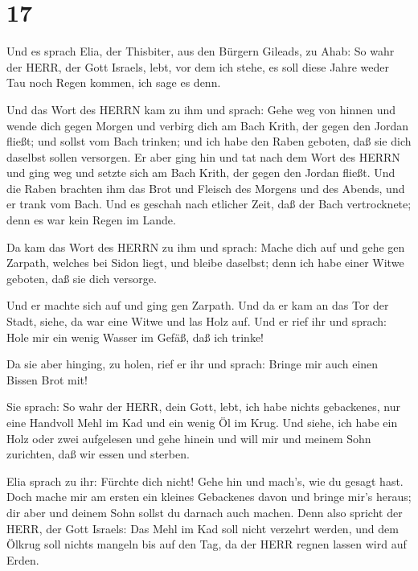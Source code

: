 \hypertarget{section-16}{%
\section{17}\label{section-16}}

 Und es sprach Elia, der Thisbiter, aus den Bürgern Gileads,
zu Ahab: So wahr der HERR, der Gott Israels, lebt, vor dem ich stehe, es
soll diese Jahre weder Tau noch Regen kommen, ich sage es denn.

 Und das Wort des HERRN kam zu ihm und sprach: 
Gehe weg von hinnen und wende dich gegen Morgen und verbirg dich am Bach
Krith, der gegen den Jordan fließt;  und sollst vom Bach
trinken; und ich habe den Raben geboten, daß sie dich daselbst sollen
versorgen.  Er aber ging hin und tat nach dem Wort des HERRN
und ging weg und setzte sich am Bach Krith, der gegen den Jordan fließt.
 Und die Raben brachten ihm das Brot und Fleisch des Morgens
und des Abends, und er trank vom Bach.  Und es geschah nach
etlicher Zeit, daß der Bach vertrocknete; denn es war kein Regen im
Lande.

 Da kam das Wort des HERRN zu ihm und sprach: 
Mache dich auf und gehe gen Zarpath, welches bei Sidon liegt, und bleibe
daselbst; denn ich habe einer Witwe geboten, daß sie dich versorge.

 Und er machte sich auf und ging gen Zarpath. Und da er kam
an das Tor der Stadt, siehe, da war eine Witwe und las Holz auf. Und er
rief ihr und sprach: Hole mir ein wenig Wasser im Gefäß, daß ich trinke!

 Da sie aber hinging, zu holen, rief er ihr und sprach:
Bringe mir auch einen Bissen Brot mit!

 Sie sprach: So wahr der HERR, dein Gott, lebt, ich habe
nichts gebackenes, nur eine Handvoll Mehl im Kad und ein wenig Öl im
Krug. Und siehe, ich habe ein Holz oder zwei aufgelesen und gehe hinein
und will mir und meinem Sohn zurichten, daß wir essen und sterben.

 Elia sprach zu ihr: Fürchte dich nicht! Gehe hin und
mach's, wie du gesagt hast. Doch mache mir am ersten ein kleines
Gebackenes davon und bringe mir's heraus; dir aber und deinem Sohn
sollst du darnach auch machen.  Denn also spricht der HERR,
der Gott Israels: Das Mehl im Kad soll nicht verzehrt werden, und dem
Ölkrug soll nichts mangeln bis auf den Tag, da der HERR regnen lassen
wird auf Erden.

